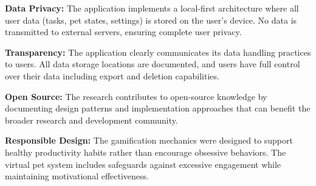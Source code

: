 \textbf{Data Privacy:} The application implements a local-first architecture where all user data (tasks, pet states, settings) is stored on the user's device. No data is transmitted to external servers, ensuring complete user privacy.

\textbf{Transparency:} The application clearly communicates its data handling practices to users. All data storage locations are documented, and users have full control over their data including export and deletion capabilities.

\textbf{Open Source:} The research contributes to open-source knowledge by documenting design patterns and implementation approaches that can benefit the broader research and development community.

\textbf{Responsible Design:} The gamification mechanics were designed to support healthy productivity habits rather than encourage obsessive behaviors. The virtual pet system includes safeguards against excessive engagement while maintaining motivational effectiveness.

